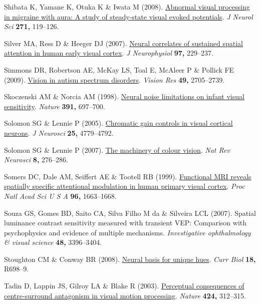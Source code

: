 \documentclass[
  letterpaper,
  DIV=11,
  numbers=noendperiod]{scrartcl}
\newlength{\cslhangindent}
\newenvironment{CSLReferences}[2] %
 {\begin{list}{}{%
  \setlength{\itemindent}{0pt}
  \setlength{\leftmargin}{0pt}
  \setlength{\parsep}{0pt}
  \ifodd #1
   \setlength{\leftmargin}{\cslhangindent}
   \setlength{\itemindent}{-1\cslhangindent}
  \fi
  \setlength{\itemsep}{#2\baselineskip}}}
 {\end{list}}
\begin{document}
\begin{CSLReferences}{1}{1}
Shibata K, Yamane K, Otuka K \& Iwata M (2008).
\href{https://doi.org/10.1016/j.jns.2008.04.004}{Abnormal visual
processing in migraine with aura: A study of steady-state visual evoked
potentials}. \emph{J Neurol Sci} \textbf{271,} 119--126.

Silver MA, Ress D \& Heeger DJ (2007).
\href{https://doi.org/10.1152/jn.00677.2006}{Neural correlates of
sustained spatial attention in human early visual cortex}. \emph{J
Neurophysiol} \textbf{97,} 229--237.

Simmons DR, Robertson AE, McKay LS, Toal E, McAleer P \& Pollick FE
(2009). \href{https://doi.org/10.1016/j.visres.2009.08.005}{Vision in
autism spectrum disorders}. \emph{Vision Res} \textbf{49,} 2705--2739.

Skoczenski AM \& Norcia AM (1998).
\href{https://doi.org/10.1038/35630}{Neural noise limitations on infant
visual sensitivity}. \emph{Nature} \textbf{391,} 697--700.

Solomon SG \& Lennie P (2005).
\href{https://doi.org/10.1523/JNEUROSCI.5316-04.2005}{Chromatic gain
controls in visual cortical neurons}. \emph{J Neurosci} \textbf{25,}
4779--4792.

Solomon SG \& Lennie P (2007).
\href{https://doi.org/10.1038/nrn2094}{The machinery of colour vision}.
\emph{Nat Rev Neurosci} \textbf{8,} 276--286.

Somers DC, Dale AM, Seiffert AE \& Tootell RB (1999).
\href{https://doi.org/10.1073/pnas.96.4.1663}{Functional MRI reveals
spatially specific attentional modulation in human primary visual
cortex}. \emph{Proc Natl Acad Sci U S A} \textbf{96,} 1663--1668.

Souza GS, Gomes BD, Saito CA, Silva Filho M da \& Silveira LCL (2007).
Spatial luminance contrast sensitivity measured with transient {VEP}:
Comparison with psychophysics and evidence of multiple mechanisms.
\emph{Investigative ophthalmology \& visual science} \textbf{48,}
3396--3404.

Stoughton CM \& Conway BR (2008).
\href{https://doi.org/10.1016/j.cub.2008.06.018}{Neural basis for unique
hues}. \emph{Curr Biol} \textbf{18,} R698--9.

Tadin D, Lappin JS, Gilroy LA \& Blake R (2003).
\href{https://doi.org/10.1038/nature01800}{Perceptual consequences of
centre-surround antagonism in visual motion processing}. \emph{Nature}
\textbf{424,} 312--315.


\end{CSLReferences}
\end{document}
